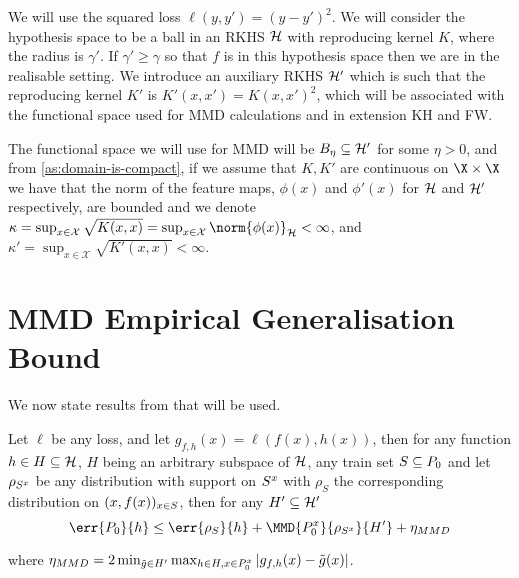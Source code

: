 We will use the squared loss \(\ell(y, y') = (y - y')^{2}\). We will consider
the hypothesis space to be a ball in an RKHS \(\mathcal{H}\) with reproducing
kernel \(K\), where the radius is \(\gamma'\). If \(\gamma' \geq \gamma\) so that \(f\) is in this
hypothesis space then we are in the realisable setting. We introduce an auxiliary RKHS \(\mathcal{H}'\) which is such
that the reproducing kernel \(K'\) is \(K'(x, x') = K(x, x')^{2}\), which will
be associated with the functional space used for MMD calculations and in
extension KH and FW.

The functional space we will use for MMD will be \(B_{\eta} \subseteq
\mathcal{H}'\) for some \(\eta > 0\), and from \ref{as:domain-is-compact}, if we
assume that \(K, K'\) are continuous on \(\X \times \X\) we have that the norm
of the feature maps, \(\phi(x)\) and \(\phi'(x)\) for \(\mathcal{H}\) and
\(\mathcal{H}'\) respectively, are bounded and we denote \(\kappa = \sup_{x \in
\mathcal{X}}\sqrt{K(x, x)} = \sup_{x \in \mathcal{X}}\norm{\phi(x)}_{\rkhs{H}} <
\infty\), and \(\kappa' = \sup_{x \in \mathcal{X}}\sqrt{K'(x, x)} < \infty\).

\section{MMD Empirical Generalisation Bound}
We now state results from \cite{viering17_nuclear_discr_activ_learn} that will be
used.
\begin{theorem}
  \label{th:mmd-emp-bound}
  Let \(\ell\) be any loss, and let \(g_{f, h}(x) = \ell(f(x), h(x))\), then for
  any function \(h \in H \subseteq \mathcal{H}\), \(H\) being an arbitrary subspace of \(\mathcal{H}\), any train set
  \(S \subseteq P_{0}\) and let \(\rho_{S^x}\) be any distribution with
  support on \(S^x\) with \(\rho_{S}\) the corresponding distribution on
  \((x, f(x))_{x \in S}\), then for any \(H' \subseteq \mathcal{H}'\)
  \begin{equation}
    \label{eq:MMD-gen-bound}
    \err{\poolset_{0}}{h} \leq \err{\rho_{\trainset}}{h} + \MMD{\poolsetx_{0}}{\rho_{\trainsetx}}{H'} + \eta_{MMD}
  \end{equation}
\end{theorem}
where \(\eta_{MMD} = 2 \min_{\tilde{g} \in H'} \max_{h \in H, x \in P^x_{0}} |g_{f, h}(x) - \tilde{g}(x)|\).

